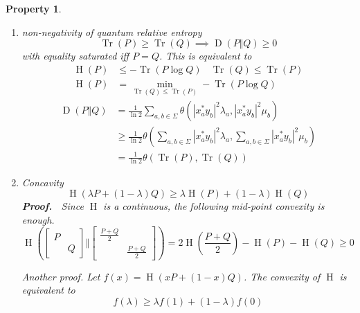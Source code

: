 \documentclass[aps,pra,onecolumn,notitlepage,superscriptaddress]{revtex4-1}
\newcommand{\Tr}{\operatorname{Tr}}
\newcommand{\op}[1]{\operatorname{#1}}
\newtheorem{proper}{Property}
\def\Proof{{\bf Proof.~}}
\begin{document}
\begin{proper}
\begin{enumerate}
            \item non-negativity of quantum relative entropy
            \begin{equation}
                \Tr(P) \geq \Tr(Q) \implies \op D(P \Vert Q) \geq 0
            \end{equation}
            with equality saturated iff $P = Q$. This is equivalent to
            \begin{align*}
                \op H(P) &\leq -\Tr(P \log Q) \ \ \ \ \Tr(Q) \leq \Tr(P) \\
                \op H(P) &= \min_{\Tr(Q) \leq \Tr(P)} -\Tr(P \log Q)
            \end{align*}
            \begin{align*}
                \op D(P \Vert Q) 
                &= \frac{1}{\ln 2} \sum_{a,b \in \Sigma} \theta( |x_a^*y_b|^2 \lambda_a, |x_a^*y_b|^2 \mu_b ) \\
                &\geq \frac{1}{\ln 2} \theta(\sum_{a,b \in \Sigma}  |x_a^*y_b|^2 \lambda_a, \sum_{a,b \in \Sigma}  |x_a^*y_b|^2 \mu_b ) \\
                &= \frac{1}{\ln 2} \theta(\Tr(P), \Tr(Q))
            \end{align*}
            \item Concavity
            \begin{equation}
                \op H(\lambda P + (1-\lambda) Q) \geq \lambda \op H(P) + (1-\lambda) \op H(Q)
            \end{equation}
            \Proof
            Since $\op H$ is a continuous, the following mid-point convexity is enough.
            \begin{equation*}
                \op H \left(
                    \begin{bmatrix}
                        P & \\
                        & Q
                    \end{bmatrix}
                    \Bigg\Vert
                    \begin{bmatrix}
                        \frac{P+Q}{2} & \\
                        & \frac{P+Q}{2}
                    \end{bmatrix}   
                \right) = 2 \op H\left(\frac{P+Q}{2}\right) - \op H(P) - \op H(Q) \geq 0
            \end{equation*}

            Another proof. Let $f(x) = \op H(xP + (1-x)Q)$. The convexity of $\op H$ is equivalent to
            \begin{equation}
                f(\lambda) \geq \lambda f(1) + (1-\lambda)f(0)
            \end{equation}


\end{enumerate}
\end{proper}
\end{document}
